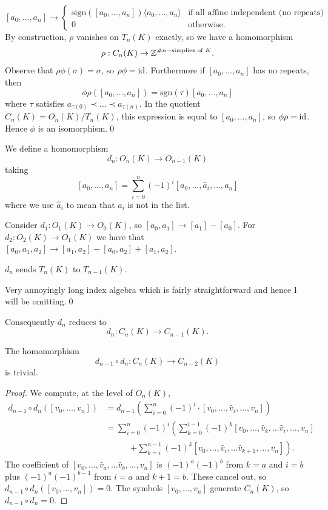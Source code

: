 \documentclass{article}
\begin{document}
\[
	[a_0,\dots, a_n] \to \begin{cases}
		\mathrm{sign}([a_0,\dots, a_n])\langle a_0,\dots, a_n\rangle & \text{if all affine independent (no repeats)} \\
		0 & \text{otherwise}.
  \end{cases}
\]
By construction, $ \rho $ vanishes on $ T_n(K) $ exactly, so we have a homomorphism
\[
  \rho : C_n(K) \to   \mathbb{Z}^{\# n-\text{simplies of } K}.
\]
Observe that $ \rho \phi(\sigma) = \sigma $, so $ \rho\phi = \mathrm{id} $. Furthermore if $ [a_0,\dots, a_n] $ has no repeats, then
\[
	\phi\rho([a_0,\dots, a_n]) = \mathrm{sgn}(\tau) [ a_0,\dots, a_n]
\]
where $ \tau $ satisfies $ a_{\tau(0)} \prec \dots \prec a_{\tau(n)} $. In the quotient $ C_n(K) = O_n(K)/T_n(K) $, this expression  is equal to $ [a_0,\dots, a_n] $, so $ \phi\rho = \mathrm{id} $. Hence $ \phi $ is an isomorphism.\qed\par
We define a homomorphism
\[
	d_n: O_n(K) \to O_{n-1}(K)
\]
taking
\[
	[a_0,\dots, a_n] = \sum_{i=0}^n (-1)^i[a_0,\dots, \hat a_i,\dots, a_n]
\]
where we use $ \hat a_i $ to mean that $ a_i $ is not in the list.
\begin{example}
	Consider $ d_1: O_1(K) \to O_0(K) $, so $ [a_0,a_1] \to [a_1] - [a_0] $. For $ d_2: O_2(K) \to O_1(K) $ we have that $ [a_0,a_1,a_2] \to [a_1,a_2] - [a_0,a_2] + [a_1,a_2] $.
\end{example}
\begin{lemma}
	$ d_n $ sends $ T_n(K) $ to $ T_{n-1}(K) $.
\end{lemma}
\pf Very annoyingly long index algebra which is fairly straightforward and hence I will be omitting.\qed\par
Consequently $ d_n $ reduces to
\[
	d_n: C_n(K) \to C_{n-1}(K).
\]
\begin{lemma}
 The homomorphism
 \[
	 d_{n-1}\circ d_n: C_n(K) \to C_{n-2}(K)
 \]
 is trivial.
\end{lemma}
\begin{proof}
We compute, at the level of $O_n(K)$,
\begin{align*}
d_{n-1} \circ d_n([v_0, \dots, v_n])
&= d_{n-1}\left( \sum_{i=0}^{n} (-1)^i \cdot [v_0, \dots, \hat{v}_i, \dots, v_n] \right) \\
&= \sum_{i=0}^{n} (-1)^i \left( \sum_{k=0}^{i-1} (-1)^k [v_0, \dots, \hat{v}_k, \dots \hat{v}_i, \dots, v_n] \right. \\
&\qquad\quad \left. + \sum_{k=i}^{n-1} (-1)^k [v_0, \dots, \hat{v}_i, \dots \hat{v}_{k+1}, \dots, v_n] \right).
\end{align*}
The coefficient of $[v_0, \dots, \hat{v}_a, \dots \hat{v}_b, \dots, v_n]$ is
$(-1)^a(-1)^b$ from $k=a$ and $i=b$ plus $(-1)^a(-1)^{b-1}$ from $i=a$ and $k+1=b$.
These cancel out, so $d_{n-1} \circ d_n([v_0, \dots, v_n]) = 0$.
The symbols $[v_0, \dots, v_n]$ generate $C_n(K)$, so $d_{n-1} \circ d_n = 0$.
\end{proof}
\end{document}
